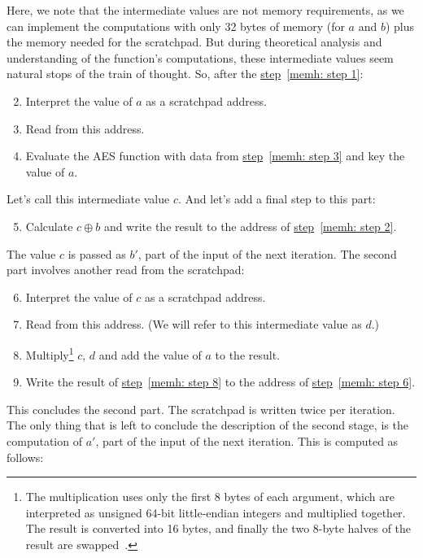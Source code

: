 Here, we note that the intermediate values are not memory requirements, as we can implement the computations with only 32 bytes of memory (for $a$ and $b$) plus the memory needed for the scratchpad. But during theoretical analysis and understanding of the function's computations, these intermediate values seem natural stops of the train of thought. So, after the \hyperref[memh: step 1]{step}~\ref{memh: step 1}:

\begin{enumerate}
  \setcounter{enumi}{1}
  \item \label{memh: step 2} Interpret the value of $a$ as a scratchpad address.
  \item \label{memh: step 3} Read from this address.
  \item Evaluate the AES function with data from \hyperref[memh: step 3]{step}~\ref{memh: step 3} and key the value of $a$.
\end{enumerate}
Let's call this intermediate value $c$. And let's add a final step to this part:
\begin{enumerate}
  \setcounter{enumi}{4}
  \item Calculate $c \oplus b$ and write the result to the address of \hyperref[memh: step 2]{step}~\ref{memh: step 2}.
\end{enumerate}
The value $c$ is passed as $b'$, part of the input of the next iteration. The second part involves another read from the scratchpad:

\begin{enumerate}
  \setcounter{enumi}{5}
  \item \label{memh: step 6} Interpret the value of $c$ as a scratchpad address.
  \item Read from this address. (We will refer to this intermediate value as $d$.)
  \item \label{memh: step 8} Multiply\footnote{The multiplication uses only the first 8 bytes of each argument, which are interpreted as unsigned 64-bit little-endian integers and multiplied together. The result is converted into 16 bytes, and finally the two 8-byte halves of the result are swapped~\cite{cryptonight}.} $c$, $d$ and add the value of $a$ to the result.
  \item Write the result of \hyperref[memh: step 8]{step}~\ref{memh: step 8} to the address of \hyperref[memh: step 6]{step}~\ref{memh: step 6}.
\end{enumerate}
This concludes the second part. The scratchpad is written twice per iteration. The only thing that is left to conclude the description of the second stage, is the computation of $a'$, part of the input of the next iteration. This is computed as follows:

